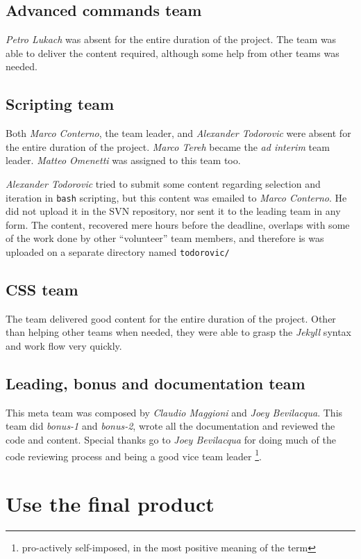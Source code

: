 \documentclass[hidelinks,12pt,a4paper,numbers=enddot]{scrartcl}
\begin{document}
\subsection{Advanced commands team}
\textit{Petro Lukach} was absent for the entire duration of the project. The team was able to deliver the content required,
although some help from other teams was needed.

\subsection{Scripting team}
Both \textit{Marco Conterno}, the team leader, and \textit{Alexander Todorovic} were absent for the entire duration of 
the project. \textit{Marco Tereh} became the \emph{ad interim} team leader. \textit{Matteo Omenetti} was assigned
to this team too.

\textit{Alexander Todorovic} tried to submit some content regarding selection and iteration in \texttt{bash} scripting,
but this content was emailed to \textit{Marco Conterno}. He did not upload it in the SVN repository, nor sent it to the
leading team in any form. The content, recovered mere hours before the deadline, overlaps with some of the work done by
other ``volunteer'' team members, and therefore is was uploaded on a separate directory named \texttt{todorovic/}

\subsection{CSS team}
The team delivered good content for the entire duration of the project. Other than helping other teams when needed, they
were able to grasp the \textit{Jekyll} syntax and work flow very quickly.

\subsection{Leading, bonus and documentation team}
This meta team was composed by \textit{Claudio Maggioni} and \textit{Joey Bevilacqua}. This team did \textit{bonus-1} and
\textit{bonus-2}, wrote all the documentation and reviewed the code and content. Special thanks go to \textit{Joey
Bevilacqua} for doing much of the code reviewing process and being a good vice team leader \footnote{pro-actively self-imposed, in the most positive meaning of the term}.

\section{Use the final product}
\end{document}
